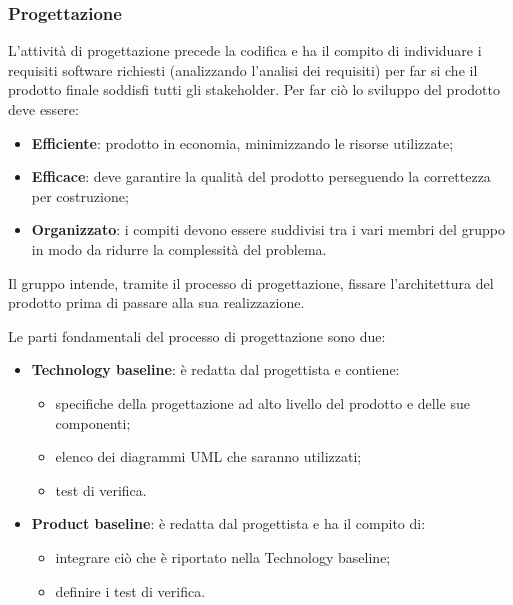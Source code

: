 \subsubsection{Progettazione}
L'attività di progettazione precede la codifica e ha il compito di individuare i requisiti software richiesti (analizzando l'analisi dei requisiti) per far si che il prodotto finale soddisfi tutti gli stakeholder. Per far ciò lo sviluppo del prodotto deve essere:
\begin{itemize}
\item \textbf{Efficiente}: prodotto in economia, minimizzando le risorse utilizzate;
\item \textbf{Efficace}: deve garantire la qualità del prodotto perseguendo la correttezza per costruzione;
\item \textbf{Organizzato}: i compiti devono essere suddivisi tra i vari membri del gruppo in modo da ridurre la complessità del problema.
\end{itemize}

Il gruppo \Omicron{} intende, tramite il processo di progettazione, fissare l'architettura del prodotto prima di passare alla sua realizzazione. 

Le parti fondamentali del processo di progettazione sono due:
\begin{itemize}
\item \textbf{Technology baseline}: è redatta dal progettista e contiene:
\begin{itemize}
\item specifiche della progettazione ad alto livello del prodotto e delle sue componenti;
\item elenco dei diagrammi UML che saranno utilizzati;
\item test di verifica.
\end{itemize}
\item \textbf{Product baseline}: è redatta dal progettista e ha il compito di:
\begin{itemize}
\item integrare ciò che è riportato nella Technology baseline;
\item definire i test di verifica.
\end{itemize}
\end{itemize} 

